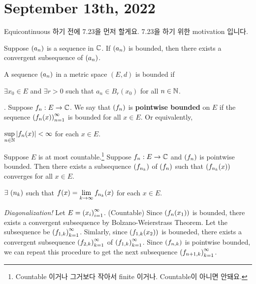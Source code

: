 \section*{September 13th, 2022}

Equicontinuous 하기 전에 7.23을 먼저 할게요. 7.23을 하기 위한 motivation 입니다.

\recall {} Suppose \(\left( a_n \right)\) is a sequence in \(\mathbb{C}\). If \(\left( a_n \right)\) is bounded, then there exists a convergent subsequence of \(\left( a_n \right)\).

\recall A sequence \(\left( a_n \right)\) in a metric space \((E, d)\) is bounded if
\begin{center}
    \(\exists x_0 \in E\) and \(\exists r > 0\) such that \(a_n \in B_r(x_0)\) for all \(n \in \mathbb{N}\).
\end{center}

. Suppose \(f_n: E \rightarrow \mathbb{C}\). We say that \(\left( f_n \right)\) is \textbf{pointwise bounded} on \(E\) if the sequence \(\left( f_n(x) \right)_{n=1}^\infty\) is bounded for all \(x \in E\). Or equivalently,
\begin{center}
    \(\displaystyle \sup_{n \in \mathbb{N}} \left| f_n(x) \right| < \infty\) for each \(x \in E\).
\end{center}

 Suppose \(E\) is at most countable.\footnote{Countable 이거나 그거보다 작아서 finite 이거나. Countable이 아니면 안돼요.} Suppose \(f_n: E \rightarrow \mathbb{C}\) and \(\left( f_n \right)\) is pointwise bounded. Then there exists a subsequence \(\left( f_{n_k} \right)\) of \(\left( f_n \right)\) such that \(\left( f_{n_k}(x) \right)\) converges for all \(x \in E\).
\begin{center}
    \(\exists \seq{n_k}\) such that \(f(x) = \displaystyle \lim_{k \rightarrow\infty} f_{n_k}(x)\) for each \(x \in E\). %
\end{center}

\pf \textit{Diagonalization!} Let \(E = \left( x_i \right)_{i=1}^\infty\). (Countable) Since \(\left( f_n(x_1) \right)\) is bounded, there exists a convergent subsequence by Bolzano-Weierstrass Theorem. Let the subsequence be \(\left( f_{1, k} \right)_{k=1}^\infty\). Simlarly, since \(\left( f_{1, k}(x_2) \right)\) is bouneded, there exists a convergent subsequence \(\left( f_{2, k} \right)_{k=1}^\infty\) of \(\left( f_{1, k} \right)_{k=1}^\infty\). Since \(\left( f_{n, k} \right)\) is pointwise bounded, we can repeat this procedure to get the next subsequence \(\left( f_{n+1, k} \right)_{k=1}^\infty\).

